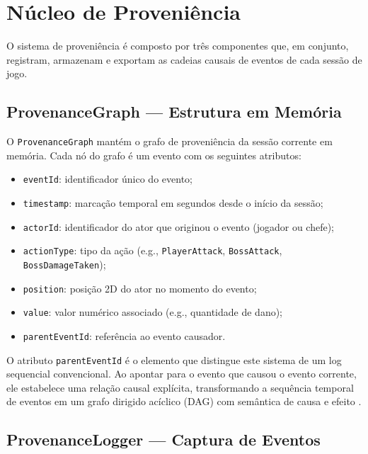 \section{Núcleo de Proveniência}
\label{sec:nucleo-proveniencia}

O sistema de proveniência é composto por três componentes que, em conjunto,
registram, armazenam e exportam as cadeias causais de eventos de cada sessão
de jogo.

\subsection{ProvenanceGraph --- Estrutura em Memória}
\label{subsec:provenance-graph}

O \texttt{ProvenanceGraph} mantém o grafo de proveniência da sessão corrente
em memória. Cada nó do grafo é um evento com os seguintes atributos:

\begin{itemize}
    \item \texttt{eventId}: identificador único do evento;
    \item \texttt{timestamp}: marcação temporal em segundos desde o início da
          sessão;
    \item \texttt{actorId}: identificador do ator que originou o evento
          (jogador ou chefe);
    \item \texttt{actionType}: tipo da ação (e.g., \texttt{PlayerAttack},
          \texttt{BossAttack}, \texttt{BossDamageTaken});
    \item \texttt{position}: posição 2D do ator no momento do evento;
    \item \texttt{value}: valor numérico associado (e.g., quantidade de dano);
    \item \texttt{parentEventId}: referência ao evento causador.
\end{itemize}

O atributo \texttt{parentEventId} é o elemento que distingue este sistema de
um log sequencial convencional. Ao apontar para o evento que causou o evento
corrente, ele estabelece uma relação causal explícita, transformando a
sequência temporal de eventos em um grafo dirigido acíclico (DAG) com
semântica de causa e efeito \cite{provenance_base}.

\subsection{ProvenanceLogger --- Captura de Eventos}
\label{subsec:provenance-logger}

